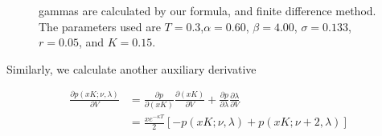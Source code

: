   \begin{figure}[!tbp]
    \centering
    \hfill
    \caption{gammas are calculated by our formula, and finite difference method. The parameters used are $T=0.3$,$\alpha = 0.60$, $\beta = 4.00$, $\sigma = 0.133$, $r = 0.05$, and $K= 0.15$.  }
  \end{figure}

\noindent Similarly, we calculate another auxiliary derivative

\begin{equation}
    \begin{aligned}
        \frac{\partial p(xK;\nu,\lambda)}{\partial V} &= \frac{\partial p}{\partial (xK)}\frac{\partial (xK)}{\partial V} + \frac{\partial p}{\partial \lambda} \frac{\partial \lambda}{\partial V} \\
        &= \frac{x e^{-\kappa T}}{2} [-p(xK ; \nu, \lambda)+p(xK ; \nu+2, \lambda)]
    \end{aligned}
\end{equation}

